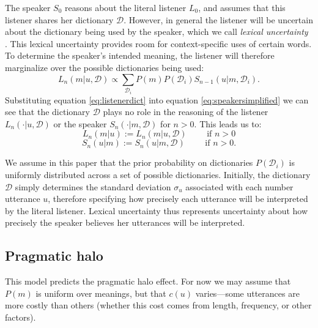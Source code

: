 \documentclass{article} %
\newcommand{\dictionary}{\ensuremath{\mathcal{D}}\xspace}
\begin{document}
The speaker $S_0$ reasons about the literal listener $L_0$, and assumes that this listener shares her dictionary $\dictionary$. However, in general the listener will be uncertain about the dictionary being used by the speaker, which we call \emph{lexical uncertainty} \cite{bergen2012}. This lexical uncertainty provides room for context-specific uses of certain words. To determine the speaker's intended meaning, the listener will therefore marginalize over the possible dictionaries being used:
\begin{equation}\label{eq:listenerdict}
L_n(m|u,\dictionary) \propto \sum_{\dictionary_i }P(m)P(\dictionary_i)S_{n-1}(u | m,\dictionary_i).
\end{equation}
Substituting equation \ref{eq:listenerdict} into equation \ref{eq:speakersimplified} we can see that the dictionary $\dictionary$ plays no role in the reasoning of the listener $L_n(\cdot|u,\dictionary)$ or the speaker $S_n(\cdot| m, \dictionary)$ for $n>0$. This leads us to:
\begin{equation}
  L_n(m | u) :=  L_n(m | u, \dictionary) \text{ ~~~~~ if $n > 0$}
\end{equation}
\begin{equation}
  S_n(u | m) :=  S_n(u | m, \dictionary) \text{ ~~~~~ if $n > 0$.}
\end{equation}

We assume in this paper that the prior probability on dictionaries $P(\dictionary_i)$ is uniformly distributed across a set of possible dictionaries. 
Initially, the dictionary $\dictionary$ simply determines the standard deviation $\sigma_u$ associated with each number utterance $u$, therefore specifying how precisely each utterance will be interpreted by the literal listener. Lexical uncertainty thus represents uncertainty about how precisely the speaker believes her utterances will be interpreted. 


\subsection{Pragmatic halo}

This model predicts the pragmatic halo effect. For now we may assume that $P(m)$ is uniform over meanings, but that $c(u)$ varies---some utterances are more costly than others (whether this cost comes from length, frequency, or other factors).
\end{document}
